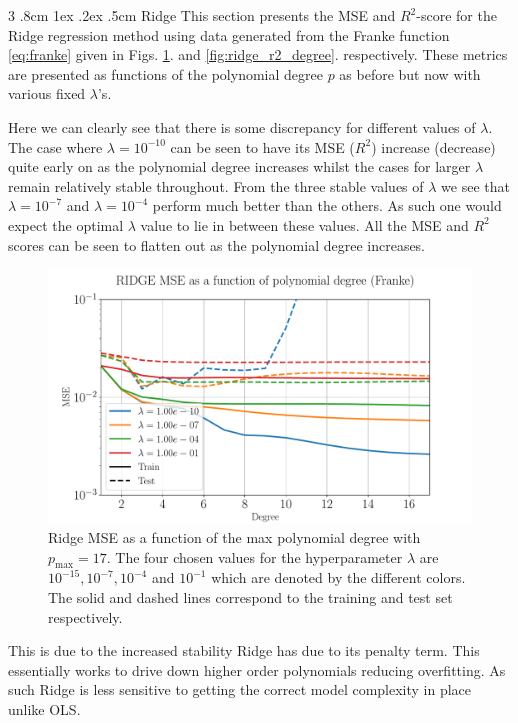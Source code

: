 \documentclass[%
reprint,
amsmath,amssymb,
aps,
pra,
]{revtex4-2}
\makeatletter
\renewcommand{\subsubsection}{%
	\@startsection
	{subsubsection}%
	{3}%
	{\z@}%
	{.8cm \@plus1ex \@minus .2ex}%
	{.5cm}%
	{\normalfont\small\centering}%
}
\makeatother
\begin{document}
\subsubsection{Ridge}
This section presents the MSE and \(R^2\)-score for the Ridge regression method using data generated from the Franke function \eqref{eq:franke} given in Figs. \ref{fig:ridge_mse_degree}. and \ref{fig:ridge_r2_degree}. respectively. These metrics are presented as functions of the polynomial degree \(p\) as before but now with various fixed \(\lambda \)'s. 

Here we can clearly see that there is some discrepancy for different values of $\lambda$. The case where $\lambda=10^{-10}$ can be seen to have its MSE ($R^2$) increase (decrease) quite early on as the polynomial degree increases whilst the cases for larger $\lambda$ remain relatively stable throughout. From the three stable values of $\lambda$ we see that $\lambda=10^{-7}$ and $\lambda=10^{-4}$ perform much better than the others. As such one would expect the optimal $\lambda$ value to lie in between these values. All the MSE and $R^2$ scores can be seen to flatten out as the polynomial degree increases. 
\begin{figure}[ht!]
	\centering
	\includegraphics[width=\linewidth]{Python/Figures/Ridge/RIDGE_MSE_Unscaled.pdf}
	\caption{Ridge MSE as a function of the max polynomial degree with \(p_{\text{max}}=17\). The four chosen values for the hyperparameter $\lambda$ are $10^{-15},10^{-7},10^{-4}$ and $10^{-1}$ which are denoted by the different colors. The solid and dashed lines correspond to the training and test set respectively.}
	\label{fig:ridge_mse_degree}
\end{figure}
This is due to the increased stability Ridge has due to its penalty term. This essentially works to drive down higher order polynomials reducing overfitting. As such Ridge is less sensitive to getting the correct model complexity in place unlike OLS.
\end{document}
